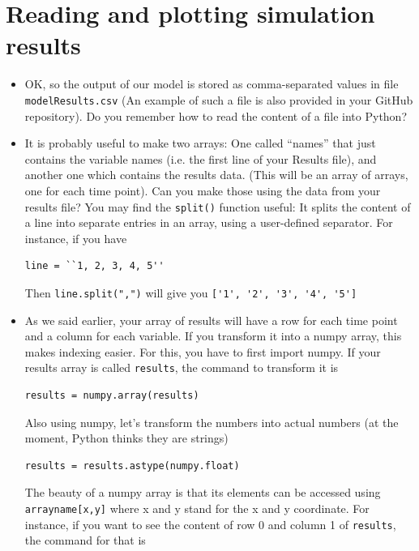 \documentclass[pdflatex,a4paper]{article}
\begin{document}
\section{Reading and plotting simulation results}

\begin{itemize}
\item
OK, so the output of our model is stored as comma-separated values in file \verb=modelResults.csv= (An example of such a file is also provided in your GitHub repository). Do you remember how to read the content of a file into Python?
\item
It is probably useful to make two arrays: One called ``names'' that just contains the variable names (i.e. the first line of your Results file), and another one which contains the results data. (This will be an array of arrays, one for each time point). Can you make those using the data from your results file? You may find the \verb=split()= function useful: It splits the content of a line into separate entries in an array, using a user-defined separator. For instance, if you have 

\begin{lstlisting}
line = ``1, 2, 3, 4, 5''
\end{lstlisting}

Then \verb=line.split(",")= will give you \verb=['1', '2', '3', '4', '5']=

\item
As we said earlier, your array of results will have a row for each time point and a column for each variable. If you transform it into a numpy array, this makes indexing easier. For this, you have to first import numpy. If your results array is called \verb=results=, the command to transform it is 

\begin{lstlisting}
results = numpy.array(results)
\end{lstlisting}

Also using numpy, let's transform the numbers into actual numbers (at the moment, Python thinks they are strings)

\begin{lstlisting}
results = results.astype(numpy.float)
\end{lstlisting}



The beauty of a numpy array is that its elements can be accessed using \verb=arrayname[x,y]= where x and y stand for the x and y coordinate. For instance, if you want to see the content of row 0 and column 1 of \verb=results=, the command for that is 


\end{itemize}
\end{document}
